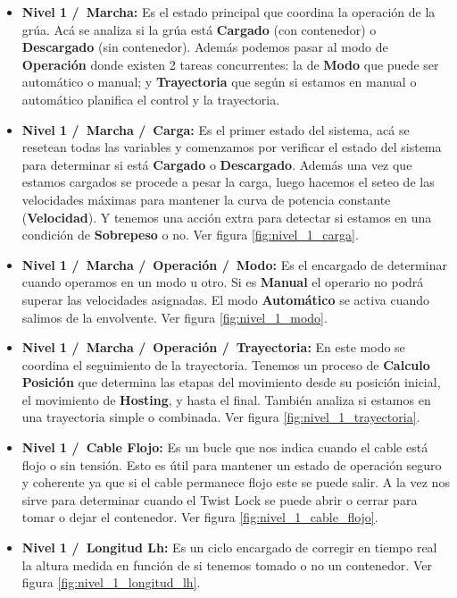 \documentclass[11pt]{article}
\begin{document}
\begin{itemize}

	\item \textbf{Nivel 1 /\ Marcha:} Es el estado principal que coordina la operación de la grúa. Acá se analiza si la grúa está \textbf{Cargado} (con contenedor) o \textbf{Descargado} (sin contenedor). Además podemos pasar al modo de \textbf{Operación} donde existen 2 tareas concurrentes: la de \textbf{Modo} que puede ser automático o manual; y \textbf{Trayectoria} que según si estamos en manual o automático planifica el control y la trayectoria.
	
	\item \textbf{Nivel 1 /\ Marcha /\ Carga:} Es el primer estado del sistema, acá se resetean todas las variables y comenzamos por verificar el estado del sistema para determinar si está \textbf{Cargado} o \textbf{Descargado}. Además una vez que estamos cargados se procede a pesar la carga, luego hacemos el seteo de las velocidades máximas para mantener la curva de potencia constante (\textbf{Velocidad}). Y tenemos una acción extra para detectar si estamos en una condición de \textbf{Sobrepeso} o no. Ver figura \ref{fig:nivel_1_carga}.
	
	\item \textbf{Nivel 1 /\ Marcha /\ Operación /\ Modo:}  Es el encargado de determinar cuando operamos en un modo u otro. Si es \textbf{Manual} el operario no podrá superar las velocidades asignadas. El modo \textbf{Automático} se activa cuando salimos de la envolvente. Ver figura \ref{fig:nivel_1_modo}.
	
	\item \textbf{Nivel 1 /\ Marcha /\ Operación /\ Trayectoria:} En este modo se coordina el seguimiento de la trayectoria. Tenemos un proceso de \textbf{Calculo Posición} que determina las etapas del movimiento desde su posición inicial, el movimiento de \textbf{Hosting}, y hasta el final. También analiza si estamos en una trayectoria simple o combinada. Ver figura \ref{fig:nivel_1_trayectoria}.
	
	\item \textbf{Nivel 1 /\ Cable Flojo:} Es un bucle que nos indica cuando el cable está flojo o sin tensión. Esto es útil para mantener un estado de operación seguro y coherente ya que si el cable permanece flojo este se puede salir. A la vez nos sirve para determinar cuando el Twist Lock se puede abrir o cerrar para tomar o dejar el contenedor. Ver figura \ref{fig:nivel_1_cable_flojo}.
	
	\item \textbf{Nivel 1 /\ Longitud Lh:} Es un ciclo encargado de corregir en tiempo real la altura medida en función de si tenemos tomado o no un contenedor. Ver figura \ref{fig:nivel_1_longitud_lh}.
	

\end{itemize}
\end{document}

